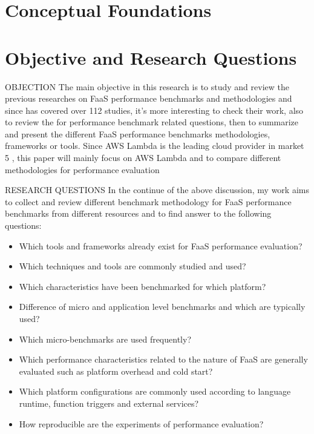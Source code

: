 %

%
\newpage
%
\section{Conceptual Foundations}
\label{sec:conceptual-foundations}

%
\newpage
%
\section{Objective and Research Questions}
\label{sec:objective-and-research-questions}
%
OBJECTION The main objective in this research is to study and review the previous researches on FaaS performance benchmarks and methodologies and since \cite{scheuner2020state} has covered over 112 studies, it's more interesting to check their work, also to review the \cite{scheuner2020state} for performance benchmark related questions, then to summarize and present the different FaaS performance benchmarks methodologies, frameworks or tools. Since AWS Lambda is the leading cloud provider in market 5 , this paper will mainly focus on AWS Lambda and to compare different methodologies for performance evaluation

RESEARCH QUESTIONS In the continue of the above discussion, my work aims to collect and review different benchmark methodology for FaaS performance benchmarks from different resources and to find answer to the following questions:
\begin{itemize}
	\item Which tools and frameworks already exist for FaaS performance evaluation?
	\item Which techniques and tools are commonly studied and used?
	\item Which characteristics have been benchmarked for which platform?
	\item Difference of micro and application level benchmarks and which are typically used?
	\item Which micro-benchmarks are used frequently?
	\item Which performance characteristics related to the nature of FaaS are generally evaluated such as platform overhead and cold start?
	\item Which platform configurations are commonly used according to language runtime, function triggers and external services?
	\item How reproducible are the experiments of performance evaluation?
\end{itemize}

